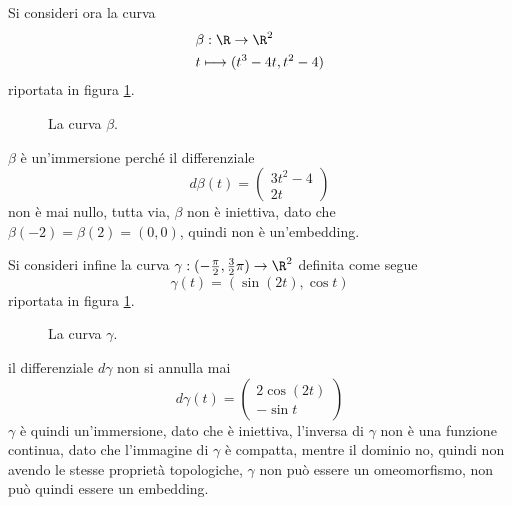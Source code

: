 \documentclass[10pt, letterpaper]{report}
\begin{document}
Si consideri ora la curva \begin{align}
    &\beta:\R\rightarrow\R^2\\
    &t\longmapsto (t^3-4t,t^2-4)
\end{align}
riportata in figura 
\ref{img:esempio_curva2}.

\begin{figure}[h!]
    \center
    \caption{La curva $\beta$.}
    \label{img:esempio_curva2}
\end{figure}
$\beta$ è un'immersione perché il differenziale \begin{equation}
    d\beta(t)=\begin{pmatrix}
        3t^2-4\\2t
    \end{pmatrix}
\end{equation}
non è mai nullo, tutta via, $\beta$ non è iniettiva, dato che $\beta(-2)=\beta(2)=(0,0)$, quindi non è un'embedding.\bigskip

Si consideri infine la curva $\gamma:(-\frac{\pi}{2},\frac{3}{2}\pi)\rightarrow\R^2$ definita come segue\begin{equation}
    \gamma(t)=(\sin(2t),\cos t)
\end{equation}
riportata in figura \ref{img:esempio_curva2}.
\begin{figure}[h!]
    \center
    \caption{La curva $\gamma$.}
    \label{img:esempio_curva3}
\end{figure}
il differenziale $d\gamma$ non si annulla mai\begin{equation}
    d\gamma(t)=\begin{pmatrix}
        2\cos(2t)\\ -\sin t
    \end{pmatrix}
\end{equation}
 $\gamma$ è quindi un'immersione, dato che è iniettiva, l'inversa di $\gamma$ non è una funzione continua, dato che l'immagine di $\gamma$ è compatta, mentre il dominio no, quindi non avendo le stesse proprietà topologiche, $\gamma$ non può essere un omeomorfismo, non può quindi essere un embedding.\bigskip
\end{document}
